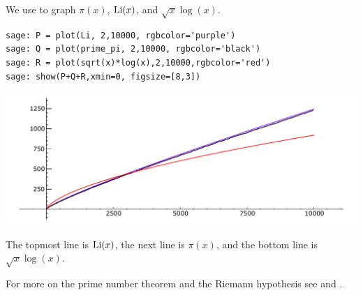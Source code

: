\begin{sg}
We use \sage to graph $\pi(x)$, $\operatorname{Li}(x)$, and $\sqrt{x}\log(x)$.
\begin{verbatim}
sage: P = plot(Li, 2,10000, rgbcolor='purple')
sage: Q = plot(prime_pi, 2,10000, rgbcolor='black')
sage: R = plot(sqrt(x)*log(x),2,10000,rgbcolor='red')
sage: show(P+Q+R,xmin=0, figsize=[8,3])
\end{verbatim}
\begin{center}
\includegraphics[width=\textwidth]{graphics/rh}
\end{center}
The topmost line is $\operatorname{Li}(x)$, the next line is $\pi(x)$, and the
bottom line is $\sqrt{x}\log(x)$.
\end{sg}

For more on the prime number theorem and
the Riemann hypothesis see \cite{zagier:primes50}
and \cite{mazur-stein:rh}.

